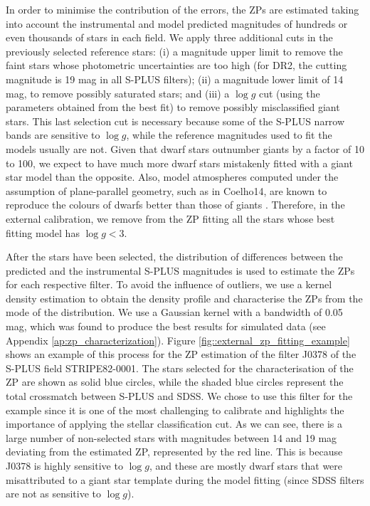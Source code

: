\documentclass[fleqn,usenatbib]{mnras}
\begin{document}
In order to minimise the contribution of the errors, the ZPs are estimated taking into account the instrumental and model predicted magnitudes of hundreds or even thousands of stars in each field. We apply three additional cuts in the previously selected reference stars: (i) a magnitude upper limit to remove the faint stars whose photometric uncertainties are too high (for DR2, the cutting magnitude is 19 mag in all S-PLUS filters); (ii) a magnitude lower limit of 14 mag, to remove possibly saturated stars; and (iii) a $\log g$ cut (using the parameters obtained from the best fit) to remove possibly misclassified giant stars. This last selection cut is necessary because some of the S-PLUS narrow bands are sensitive to $\log g$, while the reference magnitudes used to fit the models usually are not. Given that dwarf stars outnumber giants by a factor of 10 to 100, we expect to have much more dwarf stars mistakenly fitted with a giant star model than the opposite. Also, model atmospheres computed under the assumption of plane-parallel geometry, such as in Coelho14, are known to reproduce the colours of dwarfs better than those of giants \citep{Martins+2007}. Therefore, in the external calibration, we remove from the ZP fitting all the stars whose best fitting model has $\log g < 3$.

After the stars have been selected, the distribution of differences between the predicted and the instrumental S-PLUS magnitudes is used to estimate the ZPs for each respective filter. To avoid the influence of outliers, we use a kernel density estimation to obtain the density profile and characterise the ZPs from the mode of the distribution. We use a Gaussian kernel with a bandwidth of 0.05 mag, which was found to produce the best results for simulated data (see Appendix \ref{ap:zp_characterization}). Figure \ref{fig::external_zp_fitting_example} shows an example of this process for the ZP estimation of the filter J0378 of the S-PLUS field STRIPE82-0001. The stars selected for the characterisation of the ZP are shown as solid blue circles, while the shaded blue circles represent the total crossmatch between S-PLUS and SDSS. We chose to use this filter for the example since it is one of the most challenging to calibrate and highlights the importance of applying the stellar classification cut. As we can see, there is a large number of non-selected stars with magnitudes between 14 and 19 mag deviating from the estimated ZP, represented by the red line. This is because J0378 is highly sensitive to $\log g$, and these are mostly dwarf stars that were misattributed to a giant star template during the model fitting (since SDSS filters are not as sensitive to $\log g$).
\end{document}
